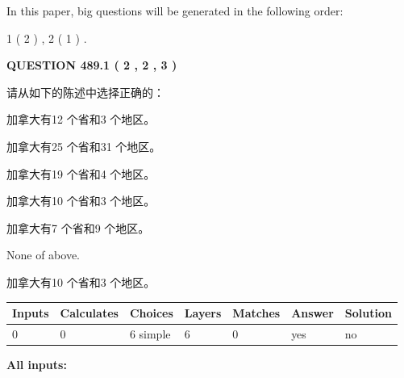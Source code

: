 \documentclass{ctexart}
\begin{document}
   
   
\vspace{0.2in}
   
In this paper, big questions will be generated in the following order: 
   
   
   1 ( 2 )
 ,
   2 ( 1 )
 .
  
\vspace{0.2in}
  
{\textbf{\Large{QUESTION
489.1 
 ( 2 , 2 , 3 )
}}}
  
  
请从如下的陈述中选择正确的：
 
 
加拿大有12 个省和3 个地区。
 
 
加拿大有25 个省和31 个地区。
 
 
加拿大有19 个省和4 个地区。
 
 
加拿大有10 个省和3 个地区。
 
 
加拿大有7 个省和9 个地区。
 
 
 None of above.
 
 
\noindent{}
 
 
加拿大有10 个省和3 个地区。
 
 
\noindent{}
 
 
   
   
   
   
\noindent\begin{tabular}{|l|l|l|l|l|l|l|}
 \hline
Inputs & Calculates & Choices & Layers & Matches & Answer & Solution \\ \hline
 0  & 
 0  & 
 6
  simple  
  & 
 6  & 
 0  & 
  yes & 
  no 
  \\ \hline
 \end{tabular}
   
   
   
   
\noindent{}
   
   
   
   
\noindent\vspace{0.1in}\hspace{-0.08in} {\textbf{\Large{All inputs: }}}
   
\end{document}
